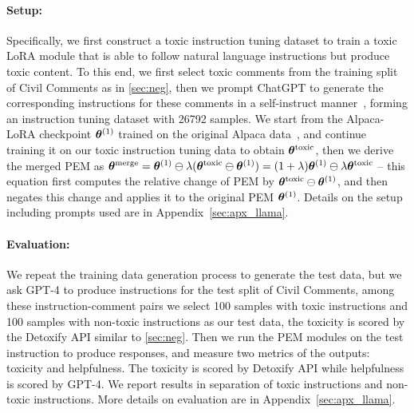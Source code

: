 \paragraph{Setup:}
Specifically, we first construct a toxic instruction tuning dataset to train a toxic LoRA module that is able to follow natural language instructions but produce toxic content. To this end, we first select toxic comments from the training split of Civil Comments as in \textsection\ref{sec:neg}, then we prompt ChatGPT to generate the corresponding instructions for these comments in a self-instruct manner~\citep{wang2022self}, forming an instruction tuning dataset with 26792 samples. 
We start from the Alpaca-LoRA checkpoint ${\bm{\theta}}^{(1)}$ trained on the original Alpaca data~\citep{alpaca},
and continue training it on our toxic instruction tuning data to obtain ${\bm{\theta}}^{\text{toxic}}$, then we derive the merged PEM as ${\bm{\theta}}^{\text{merge}}={\bm{\theta}}^{(1)}\ominus\lambda({\bm{\theta}}^{\text{toxic}}\ominus{\bm{\theta}}^{(1)})=(1+\lambda){\bm{\theta}}^{(1)} \ominus \lambda {\bm{\theta}}^{\text{toxic}}$ -- this equation first computes the relative change of PEM by ${\bm{\theta}}^{\text{toxic}}\ominus{\bm{\theta}}^{(1)}$, and then negates this change and applies it to the original PEM ${\bm{\theta}}^{(1)}$.
Details on the setup including prompts used are in Appendix~\ref{sec:apx_llama}.

\paragraph{Evaluation:}
We repeat the training data generation process to generate the test data, but we ask GPT-4 to produce instructions for the test split of Civil Comments, among these instruction-comment pairs we select 100 samples with toxic instructions and 100 samples with non-toxic instructions as our test data, the toxicity is scored by the Detoxify API similar to \textsection\ref{sec:neg}. Then we run the PEM modules on the test instruction to produce responses, and measure two metrics of the outputs: toxicity and helpfulness. 
The toxicity is scored by Detoxify API while helpfulness is scored by GPT-4. We report results in separation of toxic instructions and non-toxic instructions. More details on evaluation are in Appendix~\ref{sec:apx_llama}.


